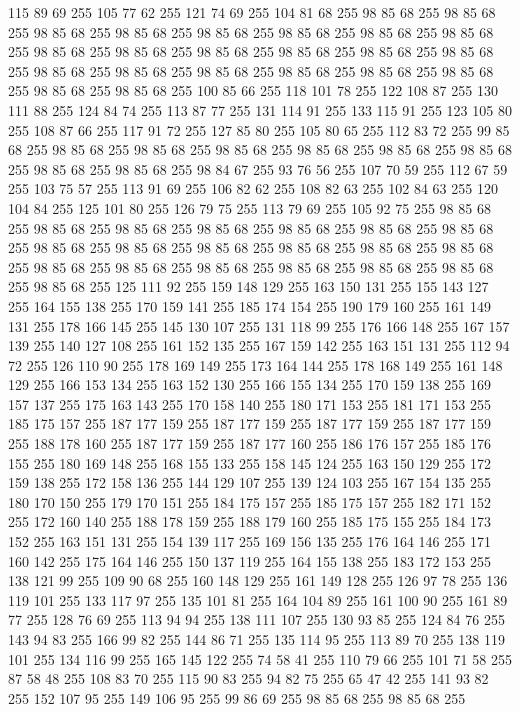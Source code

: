 115 89 69 255 105 77 62 255 121 74 69 255 104 81 68 255 98 85 68 255 98 85 68 255 98 85 68 255 98 85 68 255 98 85 68 255 98 85 68 255 98 85 68 255 98 85 68 255 98 85 68 255 98 85 68 255 98 85 68 255 98 85 68 255 98 85 68 255 98 85 68 255 98 85 68 255 98 85 68 255 98 85 68 255 98 85 68 255 98 85 68 255 98 85 68 255 98 85 68 255 98 85 68 255 100 85 66 255 118 101 78 255 122 108 87 255 130 111 88 255 124 84 74 255 113 87 77 255 131 114 91 255 133 115 91 255 123 105 80 255 108 87 66 255 117 91 72 255 127 85 80 255 105 80 65 255 112 83 72 255 99 85 68 255 98 85 68 255 98 85 68 255 98 85 68 255 98 85 68 255 98 85 68 255 98 85 68 255 98 85 68 255 98 85 68 255 98 84 67 255 93 76 56 255 107 70 59 255 112 67 59 255 103 75 57 255 113 91 69 255 106 82 62 255 108 82 63 255 102 84 63 255 120 104 84 255 125 101 80 255 126 79 75 255 113 79 69 255 105 92 75 255 98 85 68 255
98 85 68 255 98 85 68 255 98 85 68 255 98 85 68 255 98 85 68 255 98 85 68 255 98 85 68 255 98 85 68 255 98 85 68 255 98 85 68 255 98 85 68 255 98 85 68 255 98 85 68 255 98 85 68 255 98 85 68 255 98 85 68 255 98 85 68 255 98 85 68 255 98 85 68 255 125 111 92 255 159 148 129 255 163 150 131 255 155 143 127 255 164 155 138 255 170 159 141 255 185 174 154 255 190 179 160 255 161 149 131 255 178 166 145 255 145 130 107 255 131 118 99 255 176 166 148 255 167 157 139 255 140 127 108 255 161 152 135 255 167 159 142 255 163 151 131 255 112 94 72 255 126 110 90 255 178 169 149 255 173 164 144 255 178 168 149 255 161 148 129 255 166 153 134 255 163 152 130 255 166 155 134 255 170 159 138 255 169 157 137 255 175 163 143 255 170 158 140 255 180 171 153 255 181 171 153 255 185 175 157 255 187 177 159 255 187 177 159 255 187 177 159 255 187 177 159 255 188 178 160 255 187 177 159 255 187 177 160 255 186 176 157 255 185 176 155 255 180 169 148 255 168 155 133 255
158 145 124 255 163 150 129 255 172 159 138 255 172 158 136 255 144 129 107 255 139 124 103 255 167 154 135 255 180 170 150 255 179 170 151 255 184 175 157 255 185 175 157 255 182 171 152 255 172 160 140 255 188 178 159 255 188 179 160 255 185 175 155 255 184 173 152 255 163 151 131 255 154 139 117 255 169 156 135 255 176 164 146 255 171 160 142 255 175 164 146 255 150 137 119 255 164 155 138 255 183 172 153 255 138 121 99 255 109 90 68 255 160 148 129 255 161 149 128 255 126 97 78 255 136 119 101 255 133 117 97 255 135 101 81 255 164 104 89 255 161 100 90 255 161 89 77 255 128 76 69 255 113 94 94 255 138 111 107 255 130 93 85 255 124 84 76 255 143 94 83 255 166 99 82 255 144 86 71 255 135 114 95 255 113 89 70 255 138 119 101 255 134 116 99 255 165 145 122 255 74 58 41 255 110 79 66 255 101 71 58 255 87 58 48 255 108 83 70 255 115 90 83 255 94 82 75 255 65 47 42 255 141 93 82 255 152 107 95 255 149 106 95 255 99 86 69 255 98 85 68 255 98 85 68 255
